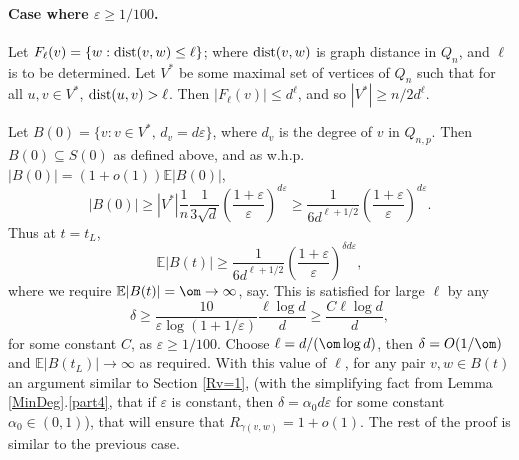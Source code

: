\documentclass[12pt]{article}
\def\a{\alpha} \def\b{\beta} \def\d{\delta} \def\D{\Delta}
\def\e{\varepsilon} \def\f{\phi} \def\F{{\Phi}} \def\vp{\varphi} \def\g{\gamma}
\newcommand{\ooi}{(1+o(1))}
\newcommand{\bfrac}[2]{\left(\frac{#1}{#2}\right)}
\newcommand{\rai}{\rightarrow \infty}
\def\seq{\subseteq}
\def\E{\mathbb{E}}
\def\dist{{\rm dist}}
\begin{document}
\paragraph{Case where  $\e \ge 1/100$.}
Let $F_\ell(v)=\{w: \dist(v,w)\le\ell\}$; where $\dist(v,w)$ is graph distance in $Q_n$, and $\ell$ is to be determined.   Let $V^*$ be some maximal set of vertices of $Q_n$ such that for all $u,v \in V^*$, $\dist(u,v)> \ell$. Then $|F_\ell(v)|\le d^\ell$, and so $|V^* |\ge n/2d^\ell$.


Let $B(0)=\{v: v \in V^*,\, d_v=d\e\}$, where $d_v$ is the degree of $v$ in $Q_{n,p}$. Then $B(0) \seq S(0)$ as defined above, and as w.h.p. $|B(0)| =\ooi \E |B(0)|$,
\[
|B(0)| \ge |V^*| \frac 1n \frac 1{3 \sqrt d} \bfrac{1+\e}{\e}^{d\e} \ge \frac 1{6d^{\ell+1/2} } \bfrac{1+\e}{\e}^{d\e}.
\]
Thus at $t=t_L$,
\[
\E |B(t)| \ge \frac{1}{6d^{\ell+1/2}} \bfrac{1+\e}{\e}^{\d d\e},
\]
where we require $\E |B(t)|  =\om\to\infty $, say. This is satisfied for large $\ell$ by any
\[
\d \ge \frac{ 10}{\e \log(1+1/\e)} \frac{\ell \log d}{d} \ge  \frac{C\ell \log d}{d},
\]
for some constant $C$, as   $\e \ge 1/100$.
Choose $\ell =d/(\om \log d)$,
then $\d=O(1/\om)$ and $\E |B(t_L)| \rai$ as required.
With this value of $\ell$, for any pair $v,w \in B(t)$
an argument similar to Section \ref{Rv=1},  (with the simplifying fact from Lemma \ref{MinDeg}.\ref{part4}, that if $\e$ is constant, then $\d=\a_0 d\e$ for some constant $\a_0 \in (0,1)$), that will ensure that $R_{\g(v,w)}=1+o(1)$.
The rest of the proof is  similar to the previous case.
\end{document}
